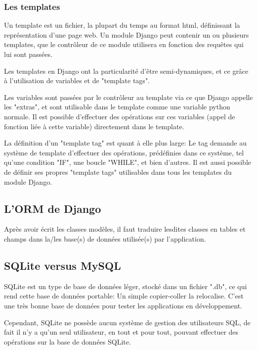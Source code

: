 \documentclass[12pt,table,a4paper]{report}
\begin{document}
\subsubsection{Les templates}
Un template est un fichier, la plupart du temps au format html, définissant la représentation d'une page web. Un module Django peut contenir un ou plusieurs templates, que le contrôleur de ce module utilisera en fonction des requêtes qui lui sont passées.

Les templates en Django ont la particularité d'être semi-dynamiques, et ce grâce à l'utilisation de variables et de "template tags".

Les variables sont passées par le contrôleur au template via ce que Django appelle les "extras", et sont utilisable dans le template comme une variable python normale. Il est possible d'effectuer des opérations sur ces variables (appel de fonction liée à cette variable) directement dans le template.

La définition d'un "template tag" est quant à elle plus large: Le tag demande au système de template d'effectuer des opérations, prédéfinies dans ce système, tel qu'une condition "IF", une boucle "WHILE", et bien d'autres. Il est aussi possible de définir ses propres "template tags" utilisables dans tous les templates du module Django.


\subsection{L'ORM de Django}
Après avoir écrit les classes modèles, il faut traduire lesdites classes en tables et champs dans la/les base(s) de données utilisée(s) par l'application.

\subsection{SQLite versus MySQL}
SQLite est un type de base de données léger, stocké dans un fichier ".db", ce qui rend cette base de données portable: Un simple copier-coller la relocalise. C'est une très bonne base de données pour tester les applications en développement.

Cependant, SQLite ne possède aucun système de gestion des utilisateurs SQL, de fait il n'y a qu'un seul utilisateur, en tout et pour tout, pouvant effectuer des opérations sur la base de données SQLite.
\end{document}
